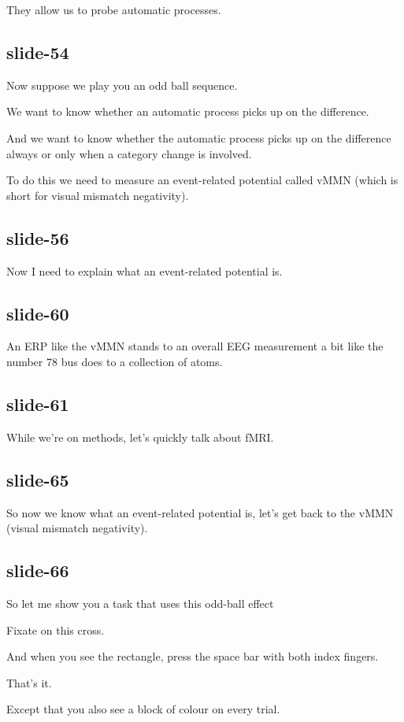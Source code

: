 \documentclass[12pt,\papersize]{extarticle}
\begin{document}
They allow us to probe automatic processes.
 
\subsection{slide-54}
Now suppose we play you an odd ball sequence.
 
We want to know whether an automatic process picks up on the difference.
 
And we want to know whether the automatic process picks up on the difference always or only when a category change is involved.
 
To do this we need to measure an event-related potential called vMMN (which is short for visual mismatch negativity).
 
\subsection{slide-56}
Now I need to explain what an event-related potential is.
 
\subsection{slide-60}
An ERP like the vMMN stands to an overall EEG measurement a bit like the number 78 bus does to a collection of atoms.
 
\subsection{slide-61}
While we're on methods, let's quickly talk about fMRI.
 
\subsection{slide-65}
So now we know what an event-related potential is, let's get back to the vMMN (visual mismatch negativity).
 
\subsection{slide-66}
So let me show you a task that uses this odd-ball effect
 
Fixate on this cross.
 
And when you see the rectangle, press the space bar with both index fingers.
 
That's it.
 
Except that you also see a block of colour on every trial.
 
\end{document}
